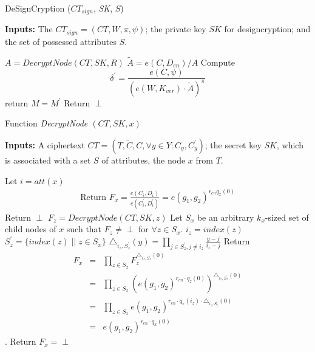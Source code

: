 \documentclass[letterpaper,12pt]{article}
\newenvironment{alginc}[1][pseudocode]{\medskip\algsetlanguage{#1}\begin{algorithmic}[1]}{\end{algorithmic}\medskip}
\begin{document}
\begin{algorithm}[!htb]
\caption{DeSignCryption (\emph{$CT_{sign}$}, \emph{SK}, $S$)}\label{alg:decryption}
\small{{\bf Inputs:} The $CT_{sign}=(CT, W, \pi,\psi)$; the private key $SK$ for designcryption; and the set of possessed attributes $S$.
}
\begin{alginc}

\State $A=DecryptNode (CT, SK, R)$
  \State $\tilde {A}= e(C,D_{en})/A$
 \EndIf
 \State Compute
 \begin{equation}
   \delta^\prime=\frac{e(C,\psi)}{(e(W,K_{ver})\cdot \tilde {A})^\pi}
 \end{equation}\label{equ:verification}
   \State return $M = M^\prime$
\EndIf
\State Return $\perp$

\end{alginc}
\end{algorithm}

\begin{algorithm}[!ht]
\caption{Function \emph{DecryptNode $(CT, SK, x)$}}\label{alg:function}
\small{{\bf Inputs:} A ciphertext $CT=( T, \tilde{C}, C, \forall y \in Y: C_y, C_y^\prime)$; the secret key $SK$, which is associated with a set $S$ of attributes, the node $x$ from $T$.
}
\begin{alginc}
    \State Let $i= att (x)$
       \begin{eqnarray}
       \mbox{Return } F_x=\frac {e(C_i, D_i)}{e(C_i^\prime, D_i^\prime)}=e(g_1,g_2)^{r_{en}q_x(0)}
      \end{eqnarray}
        \Else  \;\;Return $\perp$
        \EndIf
        \Else
            \State $F_z = DecryptNode (CT,SK,z)$
        \EndFor
        \EndIf
       \State Let $S_x$ be an arbitrary $k_x$-sized set of child nodes of $x$ such that $F_z\ne\perp$ for $\forall z\in S_x$.
        \State $i_z =index(z)$
        \State $S_z^\prime=\{index(z)\;||\; z\in S_x\}$
        \State $\triangle_{i_z,S_z^\prime}(y)=\prod_{j\in S_z^\prime,j\neq i_z}\frac{y-j}{i_z-j}$
        \EndFor
       \State Return \begin{eqnarray*}
 F_x&=& \prod_{z\in S_x} F_z^{\triangle_{i_z,S_z^\prime}(0)}\\
 &=&\prod_{z\in S_x}(e(g_1,g_2)^{r_{en}\cdot q_z(0)})^{\triangle_{i_z,S_z^\prime}(0)}\\
 &=& \prod_{z\in S_x} e(g_1,g_2)^{r_{en} \cdot q_x(i_z) \cdot {\triangle_{i_z,S_z^\prime} (0)}}\\
 &=& e(g_1,g_2)^{r_{en} \cdot q_x(0)}
\end{eqnarray*}.
        \Else
        \State Return $F_x=\perp$
        \EndIf
\end{alginc}
\end{algorithm}
\end{document}
